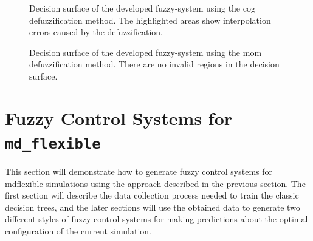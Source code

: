 \begin{multicols}{2}
\begin{figure}[H]
        \caption[Decision surface of the fuzzy rules using COG method]{Decision surface of the developed fuzzy-system using the \gls{cog} defuzzification method. The highlighted areas show interpolation errors caused by the defuzzification.}
        \label{fig:fuzzyDecisionSurfaceExampleCOG}
    \end{figure}

    \columnbreak

    \begin{figure}[H]
        \caption[Decision surface of the fuzzy rules using MOM method]{Decision surface of the developed fuzzy-system using the \gls{mom} defuzzification method. There are no invalid regions in the decision surface.}
        \label{fig:fuzzyDecisionSurfaceExampleMOM}
    \end{figure}
\end{multicols}


\section{Fuzzy Control Systems for \texttt{md\_flexible}}

This section will demonstrate how to generate fuzzy control systems for \gls{mdflexible} simulations using the approach described in the previous section. The first section will describe the data collection process needed to train the classic decision trees, and the later sections will use the obtained data to generate two different styles of fuzzy control systems for making predictions about the optimal configuration of the current simulation.

